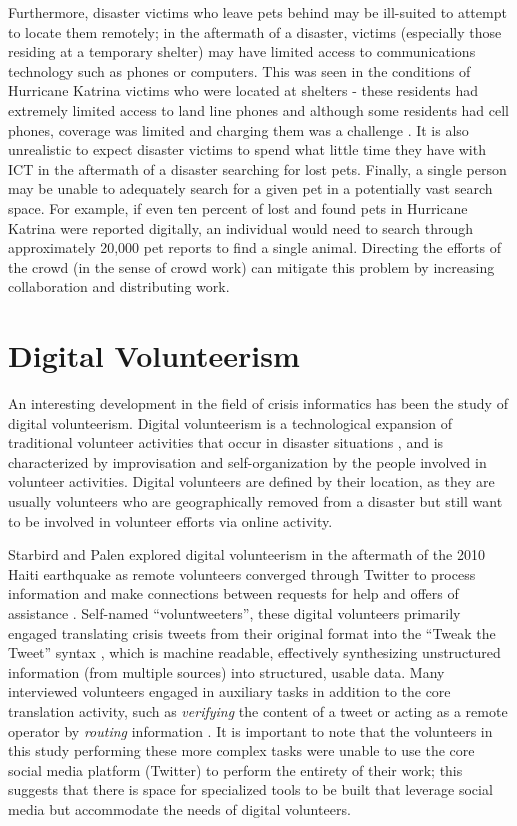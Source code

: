 Furthermore, disaster victims who leave pets behind may be ill-suited to attempt to locate them remotely; in the aftermath of a disaster, victims (especially those residing at a temporary shelter) may have limited access to communications technology such as phones or computers.  This was seen in the conditions of Hurricane Katrina victims who were located at shelters - these residents had extremely limited access to land line phones and although some residents had cell phones, coverage was limited and charging them was a challenge \cite{palen:ict}.  It is also unrealistic to expect disaster victims to spend what little time they have with ICT in the aftermath of a disaster searching for lost pets.  Finally, a single person may be unable to adequately search for a given pet in a potentially vast search space.  For example, if even ten percent of lost and found pets in Hurricane Katrina were reported digitally, an individual would need to search through approximately 20,000 pet reports to find a single animal.  Directing the efforts of the crowd (in the sense of crowd work) can mitigate this problem by increasing collaboration and distributing work.  

\section {Digital Volunteerism}

An interesting development in the field of crisis informatics has been the study of digital volunteerism.  Digital volunteerism \cite{starbird:voluntweeters} is a technological expansion of traditional volunteer activities that occur in disaster situations \cite{fritz:convergence, palen:ict}, and is characterized by improvisation and self-organization by the people involved in volunteer activities.  Digital volunteers are defined by their location, as they are usually volunteers who are geographically removed from a disaster but still want to be involved in volunteer efforts via online activity.

Starbird and Palen explored digital volunteerism in the aftermath of the 2010 Haiti earthquake as remote volunteers converged through Twitter to process information and make connections between requests for help and offers of assistance \cite{starbird:voluntweeters}.  Self-named ``voluntweeters'', these digital volunteers primarily engaged translating crisis tweets from their original format into the ``Tweak the Tweet'' syntax \cite{starbird:ttt}, which is machine readable, effectively synthesizing unstructured information (from multiple sources) into structured, usable data.  Many interviewed volunteers engaged in auxiliary tasks in addition to the core translation activity, such as {\em verifying} the content of a tweet or acting as a remote operator by {\em routing} information \cite{starbird:voluntweeters}.  It is important to note that the volunteers in this study performing these more complex tasks were unable to use the core social media platform (Twitter) to perform the entirety of their work; this suggests that there is space for specialized tools to be built that leverage social media but accommodate the needs of digital volunteers.

